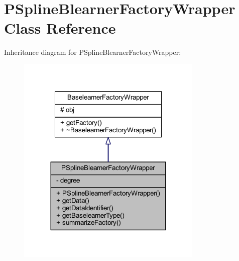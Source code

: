 \hypertarget{class_p_spline_blearner_factory_wrapper}{}\section{P\+Spline\+Blearner\+Factory\+Wrapper Class Reference}
\label{class_p_spline_blearner_factory_wrapper}


Inheritance diagram for P\+Spline\+Blearner\+Factory\+Wrapper\+:\nopagebreak
\begin{figure}[H]
\begin{center}
\leavevmode
\includegraphics[width=251pt]{class_p_spline_blearner_factory_wrapper__inherit__graph}
\end{center}
\end{figure}



